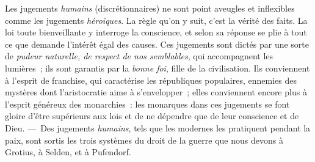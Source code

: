 \documentclass[french,twoside]{book} %
\begin{document}
Les jugements {\itshape humains} (discrétionnaires) ne sont point aveugles et inflexibles comme les jugements {\itshape héroïques}. La règle qu’on y suit, c’est la vérité des faits. La loi toute bienveillante y interroge la conscience, et selon sa réponse se plie à tout ce que demande l’intérêt égal des causes. Ces jugements sont dictés par une sorte de {\itshape pudeur naturelle, de respect de nos semblables}, qui accompagnent les lumières ; ils sont garantis par la {\itshape bonne foi}, fille de la civilisation. Ils conviennent à l’esprit de franchise, qui caractérise les républiques populaires, ennemies des mystères dont l’aristocratie aime à  s’envelopper ; elles conviennent encore plus à l’esprit généreux des monarchies : les monarques dans ces jugements se font gloire d’être supérieurs aux lois et de ne dépendre que de leur conscience et de Dieu. — Des jugements {\itshape humains}, tels que les modernes les pratiquent pendant la paix, sont sortis les trois systèmes du droit de la guerre que nous devons à Grotius, à Selden, et à Pufendorf.
\end{document}
